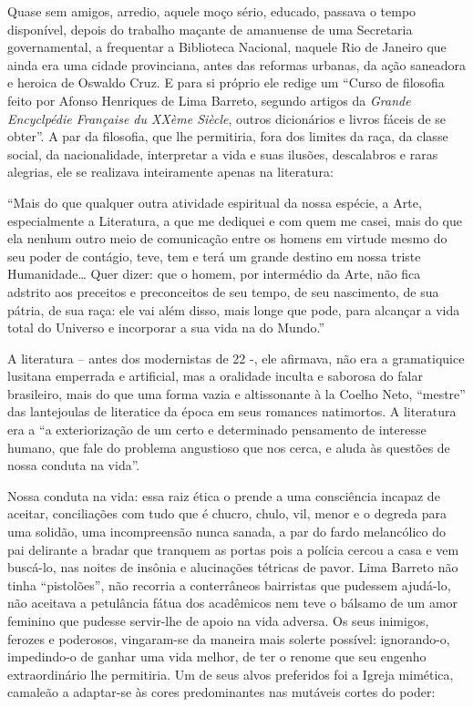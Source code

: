 \documentclass[
  letterpaper,
  DIV=11,
  numbers=noendperiod]{scrreprt}
\begin{document}
Quase sem amigos, arredio, aquele moço sério, educado, passava o tempo
disponível, depois do trabalho maçante de amanuense de uma Secretaria
governamental, a frequentar a Biblioteca Nacional, naquele Rio de
Janeiro que ainda era uma cidade provinciana, antes das reformas
urbanas, da ação saneadora e heroica de Oswaldo Cruz. E para si próprio
ele redige um ``Curso de filosofia feito por Afonso Henriques de Lima
Barreto, segundo artigos da \emph{Grande Encyclpédie Française du XXème
Siècle}, outros dicionários e livros fáceis de se obter''. A par da
filosofia, que lhe permitiria, fora dos limites da raça, da classe
social, da nacionalidade, interpretar a vida e suas ilusões, descalabros
e raras alegrias, ele se realizava inteiramente apenas na literatura:

``Mais do que qualquer outra atividade espiritual da nossa espécie, a
Arte, especialmente a Literatura, a que me dediquei e com quem me casei,
mais do que ela nenhum outro meio de comunicação entre os homens em
virtude mesmo do seu poder de contágio, teve, tem e terá um grande
destino em nossa triste Humanidade\ldots{} Quer dizer: que o homem, por
intermédio da Arte, não fica adstrito aos preceitos e preconceitos de
seu tempo, de seu nascimento, de sua pátria, de sua raça: ele vai além
disso, mais longe que pode, para alcançar a vida total do Universo e
incorporar a sua vida na do Mundo.''

A literatura -- antes dos modernistas de 22 -, ele afirmava, não era a
gramatiquice lusitana emperrada e artificial, mas a oralidade inculta e
saborosa do falar brasileiro, mais do que uma forma vazia e altissonante
à la Coelho Neto, ``mestre'' das lantejoulas de literatice da época em
seus romances natimortos. A literatura era a ``a exteriorização de um
certo e determinado pensamento de interesse humano, que fale do problema
angustioso que nos cerca, e aluda às questões de nossa conduta na
vida''.

Nossa conduta na vida: essa raiz ética o prende a uma consciência
incapaz de aceitar, conciliações com tudo que é chucro, chulo, vil,
menor e o degreda para uma solidão, uma incompreensão nunca sanada, a
par do fardo melancólico do pai delirante a bradar que tranquem as
portas pois a polícia cercou a casa e vem buscá-lo, nas noites de
insônia e alucinações tétricas de pavor. Lima Barreto não tinha
``pistolões'', não recorria a conterrâneos bairristas que pudessem
ajudá-lo, não aceitava a petulância fátua dos acadêmicos nem teve o
bálsamo de um amor feminino que pudesse servir-lhe de apoio na vida
adversa. Os seus inimigos, ferozes e poderosos, vingaram-se da maneira
mais solerte possível: ignorando-o, impedindo-o de ganhar uma vida
melhor, de ter o renome que seu engenho extraordinário lhe permitiria.
Um de seus alvos preferidos foi a Igreja mimética, camaleão a adaptar-se
às cores predominantes nas mutáveis cortes do poder:
\end{document}
